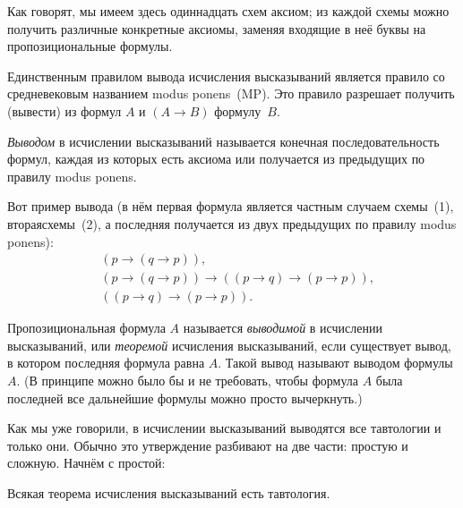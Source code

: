 \noindent
Как говорят, мы имеем здесь одиннадцать  схем аксиом; из каждой
схемы можно получить различные конкретные аксиомы, заменяя
входящие в неё буквы на пропозициональные формулы.

Единственным правилом вывода исчисления высказываний является
правило со средневековым названием  modus ponens\ (MP).%
%
Это правило разрешает получить (вывести) из формул $A$ и $(A\to
B)$ формулу~$B$.

\emph{Выводом}%
%
в исчислении высказываний называется
конечная последовательность формул, каждая из которых есть
аксиома или получается из предыдущих по правилу modus ponens.

Вот пример вывода (в нём первая формула является частным случаем
схемы~(1), вторая\т схемы~(2), а последняя получается из
двух предыдущих по правилу modus ponens):
\begin{align*}
   &(p\to(q\to p)),\\
   &(p\to(q\to p))\to((p\to q)\to(p\to p)),\\
   &((p\to q)\to(p\to p)).
\end{align*}

Пропозициональная формула $A$ называется \emph{выводимой}%
%
%
в исчислении высказываний, или \emph{теоремой}%
%
исчисления
высказываний, если существует вывод, в котором последняя формула
равна $A$. Такой вывод называют выводом формулы $A$. (В принципе
можно было бы и не требовать, чтобы формула $A$ была последней\т
все дальнейшие формулы можно просто вычеркнуть.)

Как мы уже говорили, в исчислении высказываний выводятся все
тавтологии и только они. Обычно это утверждение разбивают на две
части: простую и сложную. Начнём с простой:

\begin{theorem}[о корректности ИВ]
%
    Всякая теорема исчисления высказываний есть тавтология.
\end{theorem}

